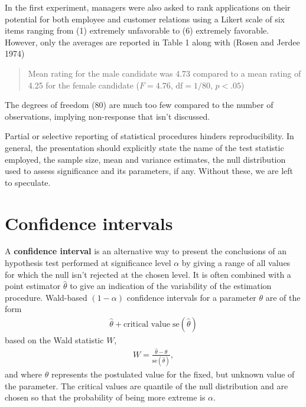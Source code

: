\documentclass[
  11pt,
  letterpaper,
]{scrbook}
\theoremstyle{definition}
\theoremstyle{remark}
\begin{document}
\begin{tcolorbox}[enhanced jigsaw, title=\textcolor{quarto-callout-caution-color}{\faFire}\hspace{0.5em}{Pitfall}, bottomtitle=1mm, opacitybacktitle=0.6, colframe=quarto-callout-caution-color-frame, leftrule=.75mm, coltitle=black, colbacktitle=quarto-callout-caution-color!10!white, colback=white, toprule=.15mm, rightrule=.15mm, breakable, bottomrule=.15mm, opacityback=0, toptitle=1mm, titlerule=0mm, arc=.35mm, left=2mm]

In the first experiment, managers were also asked to rank applications
on their potential for both employee and customer relations using a
Likert scale of six items ranging from (1) extremely unfavorable to (6)
extremely favorable. However, only the averages are reported in Table 1
along with (Rosen and Jerdee 1974)

\begin{quote}
Mean rating for the male candidate was 4.73 compared to a mean rating of
4.25 for the female candidate (\(F=4.76\), \(\text{df} = 1/80\),
\(p < .05\))
\end{quote}

The degrees of freedom (80) are much too few compared to the number of
observations, implying non-response that isn't discussed.

Partial or selective reporting of statistical procedures hinders
reproducibility. In general, the presentation should explicitly state
the name of the test statistic employed, the sample size, mean and
variance estimates, the null distribution used to assess significance
and its parameters, if any. Without these, we are left to speculate.

\end{tcolorbox}

\hypertarget{confidence-intervals}{%
\section{Confidence intervals}\label{confidence-intervals}}

A \textbf{confidence interval} is an alternative way to present the
conclusions of an hypothesis test performed at significance level
\(\alpha\) by giving a range of all values for which the null isn't
rejected at the chosen level. It is often combined with a point
estimator \(\hat{\theta}\) to give an indication of the variability of
the estimation procedure. Wald-based \((1-\alpha)\) confidence intervals
for a parameter \(\theta\) are of the form \begin{align*}
\widehat{\theta} + \text{critical value} \; \mathrm{se}(\widehat{\theta})
\end{align*} based on the Wald statistic \(W\), \begin{align*}
W =\frac{\widehat{\theta}-\theta}{\mathrm{se}(\widehat{\theta})},
\end{align*} and where \(\theta\) represents the postulated value for
the fixed, but unknown value of the parameter. The critical values are
quantile of the null distribution and are chosen so that the probability
of being more extreme is \(\alpha\).
\end{document}
